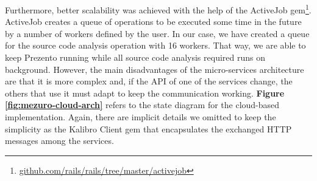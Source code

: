 \vspace{-0.75cm}

Furthermore, better scalability was achieved with the help of the ActiveJob
gem\footnote{\url{github.com/rails/rails/tree/master/activejob}}.  ActiveJob
creates a queue of operations to be executed some time in the future by a
number of workers defined by the user. In our case, we have created a queue for
the source code analysis operation with 16 workers. That way, we are able to
keep Prezento running while all source code analysis required runs on
background. However, the main disadvantages of the micro-services architecture
are that it is more complex and, if the API of one of the services change, the
others that use it must adapt to keep the communication working.
\textbf{Figure \ref{fig:mezuro-cloud-arch}} refers to the state diagram for the
cloud-based implementation. Again, there are implicit details we omitted to
keep the simplicity as the Kalibro Client gem that encapsulates the exchanged
HTTP messages among the services.

